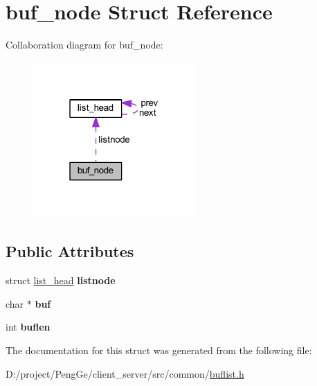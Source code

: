 \hypertarget{structbuf__node}{}\section{buf\+\_\+node Struct Reference}
\label{structbuf__node}


Collaboration diagram for buf\+\_\+node\+:
\nopagebreak
\begin{figure}[H]
\begin{center}
\leavevmode
\includegraphics[width=175pt]{structbuf__node__coll__graph}
\end{center}
\end{figure}
\subsection*{Public Attributes}
\begin{DoxyCompactItemize}
\item 
\hypertarget{structbuf__node_aa143fa62d0856b406076c74ecb520a93}{}struct \hyperlink{structlist__head}{list\+\_\+head} {\bfseries listnode}\label{structbuf__node_aa143fa62d0856b406076c74ecb520a93}

\item 
\hypertarget{structbuf__node_aafb70b3757bcb414a8699d63605bc27b}{}char $\ast$ {\bfseries buf}\label{structbuf__node_aafb70b3757bcb414a8699d63605bc27b}

\item 
\hypertarget{structbuf__node_ab2ec24b8d0668ab8216e0845abe8355d}{}int {\bfseries buflen}\label{structbuf__node_ab2ec24b8d0668ab8216e0845abe8355d}

\end{DoxyCompactItemize}


The documentation for this struct was generated from the following file\+:\begin{DoxyCompactItemize}
\item 
D\+:/project/\+Peng\+Ge/client\+\_\+server/src/common/\hyperlink{buflist_8h}{buflist.\+h}\end{DoxyCompactItemize}
